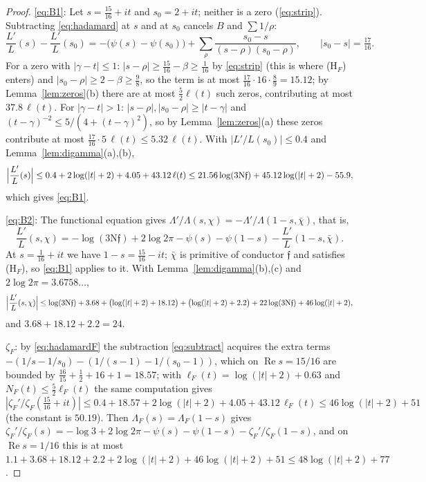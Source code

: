 \documentclass[11pt]{article}
\theoremstyle{definition}
\theoremstyle{remark}
\numberwithin{equation}{section}
\newcommand{\ff}{\mathfrak f}
\newcommand{\Nm}{\mathrm N}
\newcommand{\Rea}{\operatorname{Re}}
\newcommand{\HF}{\textup{(H$_F$)}}
\begin{document}
\begin{proof}
\eqref{eq:B1}: Let $s=\tfrac{15}{16}+it$ and $s_0=2+it$; neither is a zero (\eqref{eq:strip}). Subtracting \eqref{eq:hadamard} at $s$ and at $s_0$ cancels $B$ and $\sum1/\rho$:
\begin{equation}\label{eq:subtract}
 \frac{L'}{L}(s)-\frac{L'}{L}(s_0)=-\bigl(\psi(s)-\psi(s_0)\bigr)+\sum_\rho\frac{s_0-s}{(s-\rho)(s_0-\rho)},\qquad|s_0-s|=\tfrac{17}{16}.
\end{equation}
For a zero with $|\gamma-t|\le1$: $|s-\rho|\ge\tfrac{15}{16}-\beta\ge\tfrac1{16}$ by \eqref{eq:strip} (this is where \HF{} enters) and $|s_0-\rho|\ge2-\beta\ge\tfrac98$, so the term is at most $\tfrac{17}{16}\cdot16\cdot\tfrac89=15.12$; by Lemma~\ref{lem:zeros}(b) there are at most $\tfrac52\ell(t)$ such zeros, contributing at most $37.8\,\ell(t)$. For $|\gamma-t|>1$: $|s-\rho|,|s_0-\rho|\ge|t-\gamma|$ and $(t-\gamma)^{-2}\le5/(4+(t-\gamma)^2)$, so by Lemma~\ref{lem:zeros}(a) these zeros contribute at most $\tfrac{17}{16}\cdot5\,\ell(t)\le5.32\,\ell(t)$. With $|L'/L(s_0)|\le0.4$ and Lemma~\ref{lem:digamma}(a),(b),
\[
 \Bigl|\frac{L'}{L}(s)\Bigr|\le0.4+2\log(|t|+2)+4.05+43.12\,\ell(t)\le21.56\log(3\Nm\ff)+45.12\log(|t|+2)-55.9,
\]
which gives \eqref{eq:B1}.

\eqref{eq:B2}: The functional equation gives $\Lambda'/\Lambda(s,\chi)=-\Lambda'/\Lambda(1-s,\bar\chi)$, that is,
\begin{equation}\label{eq:FE}
 \frac{L'}{L}(s,\chi)=-\log(3\Nm\ff)+2\log2\pi-\psi(s)-\psi(1-s)-\frac{L'}{L}(1-s,\bar\chi).
\end{equation}
At $s=\tfrac1{16}+it$ we have $1-s=\tfrac{15}{16}-it$; $\bar\chi$ is primitive of conductor $\ff$ and satisfies \HF, so \eqref{eq:B1} applies to it. With Lemma~\ref{lem:digamma}(b),(c) and $2\log2\pi=3.6758\ldots$,
\[
 \Bigl|\frac{L'}{L}(s,\chi)\Bigr|\le\log(3\Nm\ff)+3.68+\bigl(\log(|t|+2)+18.12\bigr)+\bigl(\log(|t|+2)+2.2\bigr)+22\log(3\Nm\ff)+46\log(|t|+2),
\]
and $3.68+18.12+2.2=24$.

$\zeta_F$: by \eqref{eq:hadamardF} the subtraction \eqref{eq:subtract} acquires the extra terms $-(1/s-1/s_0)-(1/(s-1)-1/(s_0-1))$, which on $\Rea s=15/16$ are bounded by $\tfrac{16}{15}+\tfrac12+16+1=18.57$; with $\ell_F(t)=\log(|t|+2)+0.63$ and $N_F(t)\le\tfrac52\ell_F(t)$ the same computation gives $|\zeta_F'/\zeta_F(\tfrac{15}{16}+it)|\le0.4+18.57+2\log(|t|+2)+4.05+43.12\,\ell_F(t)\le46\log(|t|+2)+51$ (the constant is $50.19$). Then $\Lambda_F(s)=\Lambda_F(1-s)$ gives $\zeta_F'/\zeta_F(s)=-\log3+2\log2\pi-\psi(s)-\psi(1-s)-\zeta_F'/\zeta_F(1-s)$, and on $\Rea s=1/16$ this is at most $1.1+3.68+18.12+2.2+2\log(|t|+2)+46\log(|t|+2)+51\le48\log(|t|+2)+77$.
\end{proof}
\end{document}
